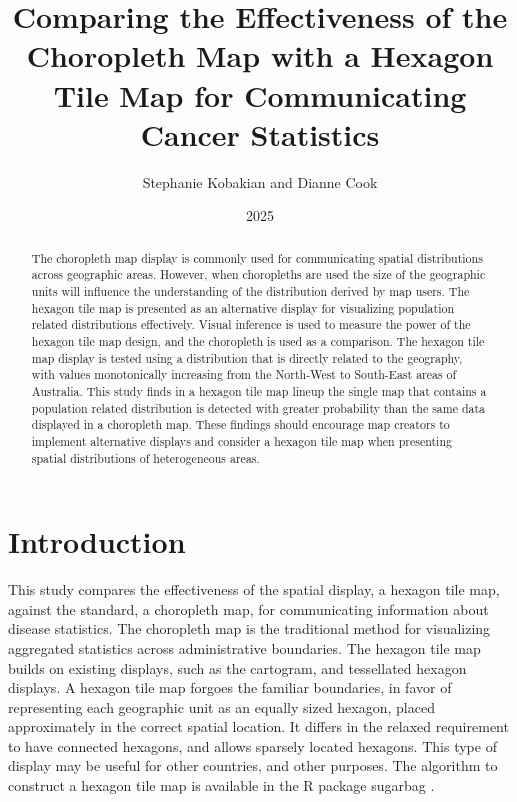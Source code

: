 \documentclass[
doublespace,
  times]{anzsauth}
\title{Comparing the Effectiveness of the Choropleth Map with a Hexagon
Tile Map for Communicating Cancer Statistics}
\author{
Stephanie Kobakian\addressnum{1} and
Dianne Cook\addressnum{2}
}
\affiliation{
Queensland University of Technology and
Monash University
}
\date{2025}
\begin{document}
\begin{abstract}
The choropleth map display is commonly used for communicating spatial
distributions across geographic areas. However, when choropleths are
used the size of the geographic units will influence the understanding
of the distribution derived by map users. The hexagon tile map is
presented as an alternative display for visualizing population related
distributions effectively. Visual inference is used to measure the power
of the hexagon tile map design, and the choropleth is used as a
comparison. The hexagon tile map display is tested using a distribution
that is directly related to the geography, with values monotonically
increasing from the North-West to South-East areas of Australia. This
study finds in a hexagon tile map lineup the single map that contains a
population related distribution is detected with greater probability
than the same data displayed in a choropleth map. These findings should
encourage map creators to implement alternative displays and consider a
hexagon tile map when presenting spatial distributions of heterogeneous
areas.
\end{abstract}

          

\maketitle


\section{Introduction}\label{sec-introduction}

This study compares the effectiveness of the spatial display, a hexagon
tile map, against the standard, a choropleth map, for communicating
information about disease statistics. The choropleth map is the
traditional method for visualizing aggregated statistics across
administrative boundaries. The hexagon tile map builds on existing
displays, such as the cartogram, and tessellated hexagon displays. A
hexagon tile map forgoes the familiar boundaries, in favor of
representing each geographic unit as an equally sized hexagon, placed
approximately in the correct spatial location. It differs in the relaxed
requirement to have connected hexagons, and allows sparsely located
hexagons. This type of display may be useful for other countries, and
other purposes. The algorithm to construct a hexagon tile map is
available in the R package sugarbag \citep{sugarbag}.
\end{document}
